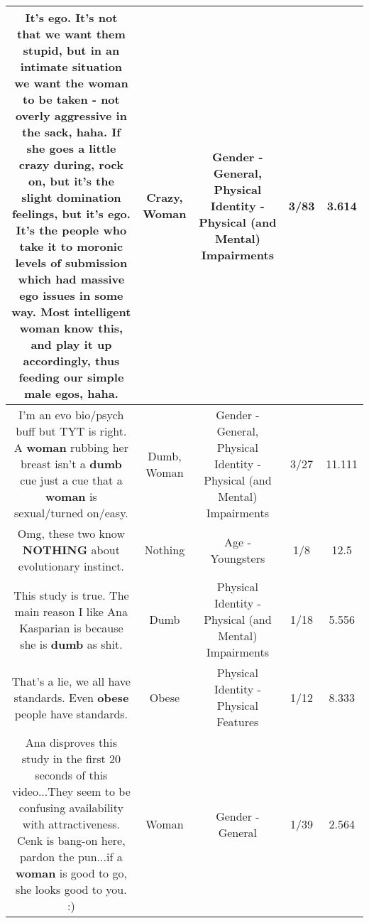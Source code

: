 \documentclass[11pt]{article}
\newlength\mylength
\begin{document}
\begin{center}
\begin{longtable}{|C{.65\mylength}|C{.30\mylength}|C{.12\mylength}|C{.12\mylength}|C{.12\mylength}|}
  \small It's ego. It's not that we want them stupid, but in an intimate situation we want the \textbf{woman} to be taken - not overly aggressive in the sack, haha. If she goes a little \textbf{crazy} during, rock on, but it's the slight domination feelings, but it's ego. It's the people who take it to moronic levels of submission which had massive ego issues in some way. Most intelligent \textbf{woman} know this, and play it up accordingly, thus feeding our simple male egos, haha.\normalsize   & Crazy, Woman & Gender - General, Physical Identity - Physical (and Mental) Impairments & 3/83 & 3.614 \\  \hline
  \small I'm an evo bio/psych buff but TYT is right.  A \textbf{woman} rubbing her breast isn't a \textbf{dumb} cue just a cue that a \textbf{woman} is sexual/turned on/easy.\normalsize   & Dumb, Woman & Gender - General, Physical Identity - Physical (and Mental) Impairments & 3/27 & 11.111 \\  \hline
  \small Omg, these two know \textbf{NOTHING} about evolutionary instinct.\normalsize   & Nothing & Age - Youngsters & 1/8 & 12.5 \\  \hline
  \small This study is true.  The main reason I like Ana Kasparian is because she is \textbf{dumb} as shit.\normalsize   & Dumb & Physical Identity - Physical (and Mental) Impairments & 1/18 & 5.556 \\  \hline
  \small That's a lie, we all have standards. Even \textbf{obese} people have standards.\normalsize   & Obese & Physical Identity - Physical Features & 1/12 & 8.333 \\  \hline
  \small Ana disproves this study in the first 20 seconds of this video...They seem to be confusing availability with attractiveness. Cenk is bang-on here, pardon the pun...if a \textbf{woman} is good to go, she looks good to you. :)\normalsize   & Woman & Gender - General & 1/39 & 2.564 \\  \hline

\end{longtable}
\end{center}
\end{document}
